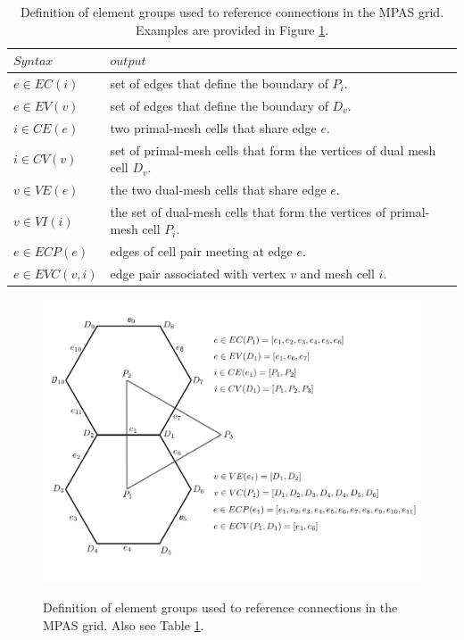 %
\begin{table}[p]
\caption{Definition of element groups used to reference connections in the MPAS grid. Examples are provided in Figure \ref{figure:gridConnectivity}.}
\label{table:gridConnectivity}
\begin{center}
\begin{tabular}{lll}
\hline\hline
$Syntax$ & $output$\\
\hline
 $e \in EC(i) $   & set of edges that define the boundary of $P_i$. \\
 $e \in EV(v) $     & set of edges that define the boundary of $D_v$. \\
 $i \in CE(e) $                 & two primal-mesh cells that share edge $e$. \\
 $i \in CV(v) $  &  set of primal-mesh cells that form the vertices of dual mesh cell $D_v$. \\
 $v\in VE(e) $  & the two dual-mesh cells that share edge $e$. \\
 $v \in VI(i) $   & the set of dual-mesh cells that form the vertices of primal-mesh cell $P_i$. \\
 $e \in ECP(e)$ & edges of cell pair meeting at edge $e$. \\
 $e \in EVC(v,i)$ & edge pair associated with vertex $v$ and mesh cell $i$. \\
\hline
\end{tabular}
\end{center}
\end{table}
%
%
\begin{figure}[p]
   \noindent\includegraphics[width=16cm,angle=0]{figures/gridConnectivity.pdf}\\
  \caption{Definition of element groups used to reference connections in the MPAS grid. Also see Table \ref{table:gridConnectivity}.}
  \label{figure:gridConnectivity}
\end{figure}


